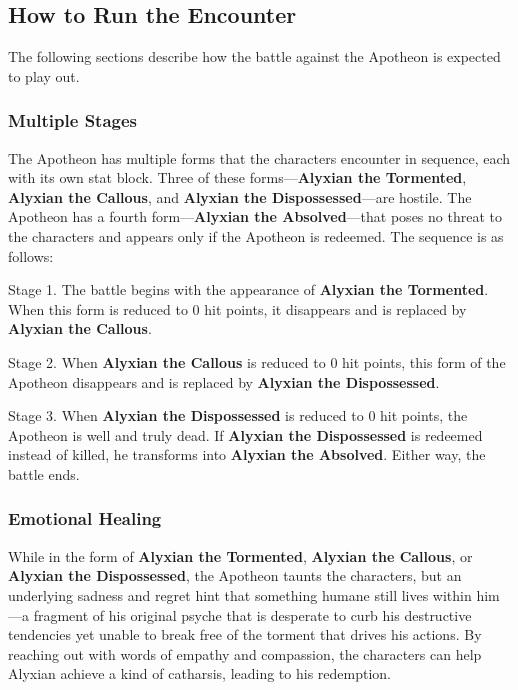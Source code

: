 \documentclass[a4paper, 11pt, bg=full, twocolumn, nooutline]{dndbook}
\begin{document}
\subsection{How to Run the Encounter}

The following sections describe how the battle against the Apotheon is expected to play out.

\subsubsection{Multiple Stages}

The Apotheon has multiple forms that the characters encounter in sequence, each with its own stat block. Three of these forms---\textbf{Alyxian the Tormented}, \textbf{Alyxian the Callous}, and \textbf{Alyxian the Dispossessed}---are hostile. The Apotheon has a fourth form---\textbf{Alyxian the Absolved}---that poses no threat to the characters and appears only if the Apotheon is redeemed. The sequence is as follows:

Stage 1. The battle begins with the appearance of \textbf{Alyxian the Tormented}. When this form is reduced to 0 hit points, it disappears and is replaced by \textbf{Alyxian the Callous}.

Stage 2. When \textbf{Alyxian the Callous} is reduced to 0 hit points, this form of the Apotheon disappears and is replaced by \textbf{Alyxian the Dispossessed}.

Stage 3. When \textbf{Alyxian the Dispossessed} is reduced to 0 hit points, the Apotheon is well and truly dead. If \textbf{Alyxian the Dispossessed} is redeemed instead of killed, he transforms into \textbf{Alyxian the Absolved}. Either way, the battle ends.

\subsubsection{Emotional Healing}

While in the form of \textbf{Alyxian the Tormented}, \textbf{Alyxian the Callous}, or \textbf{Alyxian the Dispossessed}, the Apotheon taunts the characters, but an underlying sadness and regret hint that something humane still lives within him---a fragment of his original psyche that is desperate to curb his destructive tendencies yet unable to break free of the torment that drives his actions. By reaching out with words of empathy and compassion, the characters can help Alyxian achieve a kind of catharsis, leading to his redemption.
\end{document}

